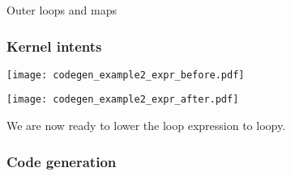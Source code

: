 \documentclass[thesis]{subfiles}
\begin{document}
\begin{example}{Outer loops and maps}
\begin{table}
  \caption{
    Intent values supported by  kernels and their corresponding pack/unpack instructions.
    In the instructions, the variable `' is used to represent the indexed view of some piece of global data (e.g. ) and the variable `' is the temporary buffer for storing the materialised data.
    Table entries marked with a `\pycode{-}' indicate that no pack/unpack instruction is emitted for this intent.
  }
  \label{tab:intents}
\end{table}

\subsubsection{Kernel intents}



\begin{center}
  \texttt{[image: codegen\_example2\_expr\_before.pdf]}
\end{center}


\begin{center}
  \texttt{[image: codegen\_example2\_expr\_after.pdf]}
\end{center}

We are now ready to lower the loop expression to loopy.

\subsubsection{Code generation}


\begin{listing}
  \centering
  \begin{minipage}{.9\textwidth}
    \inputminted{c}{./scripts/artefacts/codegen_example2_c_code_tidy.c}
  \end{minipage}
  \caption{
    C code generated for the loop expression.
  }
  \label{listing:codegen_example2_c_code}
\end{listing}


\end{example}
\end{document}
